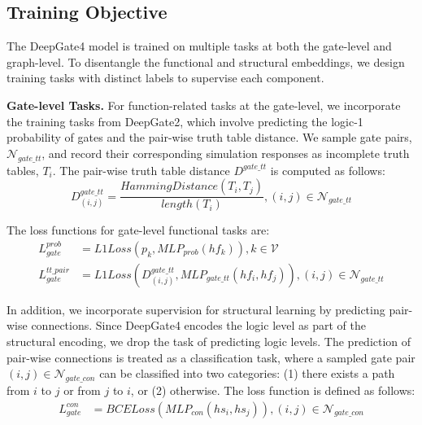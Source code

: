 \subsection{Training Objective}
\label{detailed_training_objective}
The DeepGate4 model is trained on multiple tasks at both the gate-level and graph-level. To disentangle the functional and structural embeddings, we design training tasks with distinct labels to supervise each component.

\noindent\textbf{Gate-level Tasks.}
For function-related tasks at the gate-level, we incorporate the training tasks from DeepGate2, which involve predicting the logic-1 probability of gates and the pair-wise truth table distance. We sample gate pairs, $\mathcal{N}_{gate\_tt}$, and record their corresponding simulation responses as incomplete truth tables, $T_{i}$. The pair-wise truth table distance $D^{gate\_tt}$ is computed as follows:
\begin{equation}
    D^{gate\_tt}_{(i,j)} = \frac{HammingDistance(T_i, T_j)}{length(T_i)}, (i, j)\in \mathcal{N}_{gate\_tt}
\label{eq:tt_distance}
\end{equation}

The loss functions for gate-level functional tasks are:
\begin{equation} \label{Eq:loss:gatefunc}
    \begin{split}
        L_{gate}^{prob} & = L1Loss(p_k, MLP_{prob}(hf_k)), k \in \mathcal{V} \\
        L_{gate}^{tt\_pair} & = L1Loss(D^{gate\_tt}_{(i, j)}, MLP_{gate\_tt}(hf_i, hf_j)), (i, j) \in \mathcal{N}_{gate\_tt}
    \end{split}
\end{equation}

In addition, we incorporate supervision for structural learning by predicting pair-wise connections. Since DeepGate4 encodes the logic level as part of the structural encoding, we drop the task of predicting logic levels. The prediction of pair-wise connections is treated as a classification task, where a sampled gate pair $(i, j) \in \mathcal{N}_{gate\_con}$ can be classified into two categories: (1) there exists a path from $i$ to $j$ or from $j$ to $i$, or (2) otherwise. The loss function is defined as follows:
\begin{equation} \label{Eq:loss:gatestru}
    \begin{split}
        L_{gate}^{con} & = BCELoss(MLP_{con}(hs_i, hs_j)), (i, j) \in \mathcal{N}_{gate\_con}
    \end{split}
\end{equation}

